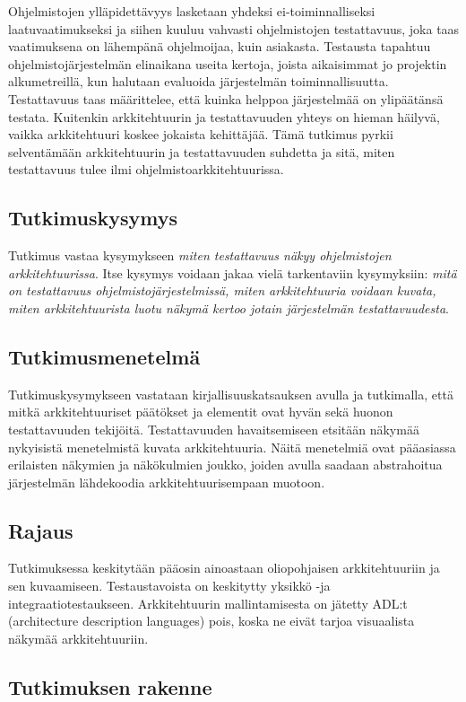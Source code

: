 \documentclass[finnish]{tktltiki2}
\theoremstyle{definition}
\theoremstyle{remark}
\begin{document}
Ohjelmistojen ylläpidettävyys lasketaan yhdeksi ei-toiminnalliseksi laatuvaatimukseksi ja siihen kuuluu vahvasti ohjelmistojen testattavuus, joka taas vaatimuksena on lähempänä ohjelmoijaa, kuin asiakasta. Testausta tapahtuu ohjelmistojärjestelmän elinaikana useita kertoja, joista  aikaisimmat jo projektin alkumetreillä, kun halutaan evaluoida järjestelmän toiminnallisuutta. Testattavuus taas määrittelee, että kuinka helppoa järjestelmää on ylipäätänsä testata. Kuitenkin arkkitehtuurin ja testattavuuden yhteys on hieman häilyvä, vaikka arkkitehtuuri koskee jokaista kehittäjää. Tämä tutkimus pyrkii selventämään arkkitehtuurin ja testattavuuden suhdetta ja sitä, miten testattavuus tulee ilmi ohjelmistoarkkitehtuurissa. 

\subsection{Tutkimuskysymys}
Tutkimus vastaa kysymykseen \textit{miten testattavuus näkyy ohjelmistojen arkkitehtuurissa}. Itse kysymys voidaan jakaa vielä tarkentaviin kysymyksiin: \textit{mitä on testattavuus ohjelmistojärjestelmissä, miten arkkitehtuuria voidaan kuvata, miten arkkitehtuurista luotu näkymä kertoo jotain järjestelmän testattavuudesta}. 

\subsection{Tutkimusmenetelmä}
Tutkimuskysymykseen vastataan kirjallisuuskatsauksen avulla ja tutkimalla, että mitkä arkkitehtuuriset päätökset ja elementit ovat hyvän sekä huonon testattavuuden tekijöitä. Testattavuuden havaitsemiseen etsitään näkymää nykyisistä menetelmistä kuvata arkkitehtuuria. Näitä menetelmiä ovat pääasiassa erilaisten näkymien ja näkökulmien joukko, joiden avulla saadaan abstrahoitua järjestelmän lähdekoodia arkkitehtuurisempaan muotoon.

\subsection{Rajaus}

Tutkimuksessa keskitytään pääosin ainoastaan oliopohjaisen arkkitehtuuriin ja sen kuvaamiseen. Testaustavoista on keskitytty yksikkö -ja integraatiotestaukseen. Arkkitehtuurin mallintamisesta on jätetty ADL:t (architecture description languages) pois, koska ne eivät tarjoa visuaalista näkymää arkkitehtuuriin.

\subsection{Tutkimuksen rakenne}
\end{document}
